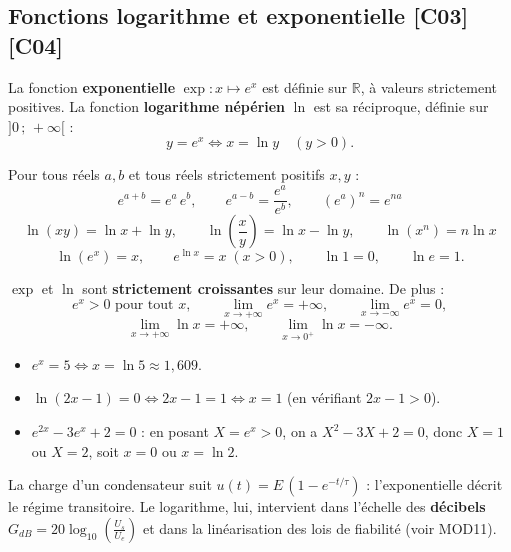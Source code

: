 \documentclass[a4paper,11pt]{article}
\begin{document}
\subsection{Fonctions logarithme et exponentielle \hfill {\normalsize\color{uimmred}[C03]\,[C04]}}

\begin{definition}
La fonction \textbf{exponentielle} $\exp : x \mapsto e^x$ est définie sur $\mathbb{R}$, à valeurs strictement positives. La fonction \textbf{logarithme népérien} $\ln$ est sa réciproque, définie sur $]0\,;\,+\infty[$ :
\[
y = e^x \iff x = \ln y \quad (y > 0).
\]
\end{definition}

\begin{theoreme}
Pour tous réels $a, b$ et tous réels strictement positifs $x, y$ :
\[
e^{a+b} = e^a\,e^b, \qquad e^{a-b} = \frac{e^a}{e^b}, \qquad (e^a)^n = e^{na}
\]
\[
\ln(xy) = \ln x + \ln y, \qquad \ln\!\left(\frac{x}{y}\right) = \ln x - \ln y, \qquad \ln(x^n) = n\ln x
\]
\[
\ln(e^x) = x, \qquad e^{\ln x} = x \;(x>0), \qquad \ln 1 = 0, \qquad \ln e = 1.
\]
\end{theoreme}

\begin{theoreme}[-- Variations]
$\exp$ et $\ln$ sont \textbf{strictement croissantes} sur leur domaine. De plus :
\[
e^x > 0 \text{ pour tout } x, \qquad \lim_{x \to +\infty} e^x = +\infty, \qquad \lim_{x \to -\infty} e^x = 0,
\]
\[
\lim_{x \to +\infty} \ln x = +\infty, \qquad \lim_{x \to 0^+} \ln x = -\infty.
\]
\end{theoreme}

\begin{exemple}
\begin{itemize}
  \item $e^x = 5 \iff x = \ln 5 \approx 1{,}609$.
  \item $\ln(2x - 1) = 0 \iff 2x - 1 = 1 \iff x = 1$ (en vérifiant $2x - 1 > 0$).
  \item $e^{2x} - 3e^x + 2 = 0$ : en posant $X = e^x > 0$, on a $X^2 - 3X + 2 = 0$, donc $X = 1$ ou $X = 2$, soit $x = 0$ ou $x = \ln 2$.
\end{itemize}
\end{exemple}

\begin{appliindus}
La charge d'un condensateur suit $u(t) = E\,(1 - e^{-t/\tau})$ : l'exponentielle décrit le régime transitoire. Le logarithme, lui, intervient dans l'échelle des \textbf{décibels} $G_{dB} = 20\log_{10}\!\left(\frac{U_s}{U_e}\right)$ et dans la linéarisation des lois de fiabilité (voir MOD11).
\end{appliindus}
\end{document}

